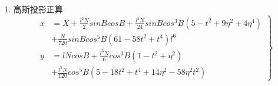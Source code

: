 \begin{enumerate}




          \subsection{高斯投影正算}

          高斯投影正算就是将球面上一点的大地坐标 $(B, L)$ 投影为高斯平面直角坐标 $(x, y)$。

    \item 高斯投影正算
          \begin{equation}
              \left .
              \begin{aligned}
                  x & =X+\frac{l^2 N}{2}sinBcosB +\frac{l^4 N}{24}sinBcos^3B(5-t^2 +9\eta^2+4\eta^4) \\
                    & +\frac{N}{720}sinBcos^5 B(61-58t^2 +t^4)l^6                                    \\
                  y & =l N cosB+\frac{l^3 N}{6}cos^3 B(1-t^2 +\eta^2 )                               \\
                    & +\frac{l^5 N}{120}cos^5 B (5-18t^2+t^4 +14\eta^2 -58\eta^2t^2)
              \end{aligned}
              \right \}
          \end{equation}


\end{enumerate}
